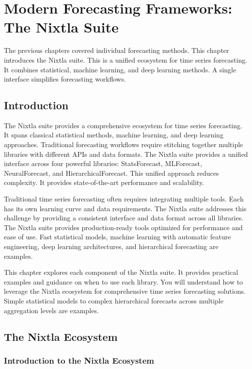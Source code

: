 \chapter{Modern Forecasting Frameworks: The Nixtla Suite}

The previous chapters covered individual forecasting methods. This chapter introduces the Nixtla suite. This is a unified ecosystem for time series forecasting. It combines statistical, machine learning, and deep learning methods. A single interface simplifies forecasting workflows.

\section{Introduction}

The Nixtla suite provides a comprehensive ecosystem for time series forecasting. It spans classical statistical methods, machine learning, and deep learning approaches. Traditional forecasting workflows require stitching together multiple libraries with different APIs and data formats. The Nixtla suite provides a unified interface across four powerful libraries: StatsForecast, MLForecast, NeuralForecast, and HierarchicalForecast. This unified approach reduces complexity. It provides state-of-the-art performance and scalability.

Traditional time series forecasting often requires integrating multiple tools. Each has its own learning curve and data requirements. The Nixtla suite addresses this challenge by providing a consistent interface and data format across all libraries. The Nixtla suite provides production-ready tools optimized for performance and ease of use. Fast statistical models, machine learning with automatic feature engineering, deep learning architectures, and hierarchical forecasting are examples.

This chapter explores each component of the Nixtla suite. It provides practical examples and guidance on when to use each library. You will understand how to leverage the Nixtla ecosystem for comprehensive time series forecasting solutions. Simple statistical models to complex hierarchical forecasts across multiple aggregation levels are examples.

\section{The Nixtla Ecosystem}

\subsection{Introduction to the Nixtla Ecosystem}

